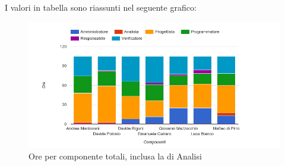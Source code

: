 I valori in tabella sono riassunti nel seguente grafico: \\ 

    \begin{figure}[H]
      \begin{center}
        \includegraphics[width=15cm]{res/img/suddivisioneRuoloProspettoOrario/orePerComponenteTotaliSenzaAnalisi.png}
      \caption{Ore per componente totali, inclusa la  di Analisi}
      \end{center} 
    \end{figure}    
    
    

